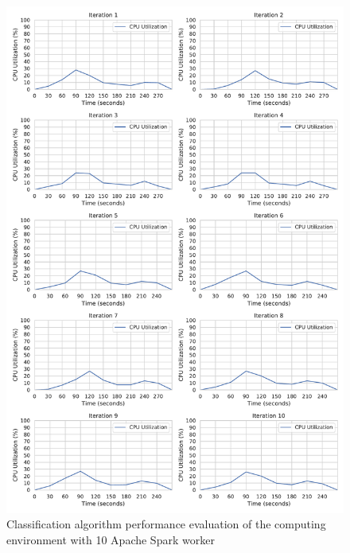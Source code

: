 \begin{figure}[h]
\centering
\includegraphics[scale=0.4]{images/07_evaluation/taxi/taxi_10_worker_cpu_performance}
\caption{Classification algorithm performance evaluation of the computing environment with 10 Apache Spark worker}
\label{fig:07_mortgage_static-cpu_results}
\end{figure}

